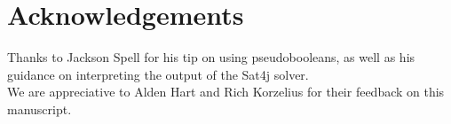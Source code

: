 
\section{Acknowledgements} 
\label{sec:ack} 

Thanks to Jackson Spell for his tip on using pseudobooleans, as well
as his guidance on interpreting the output of the Sat4j solver. \\
We are appreciative to Alden Hart and Rich Korzelius for their
feedback on this manuscript.
